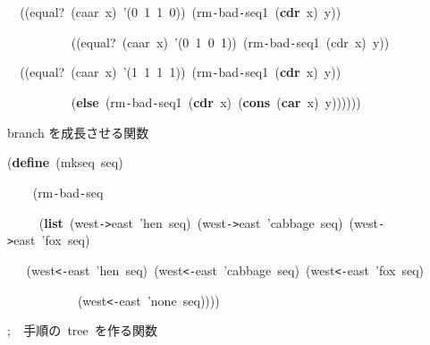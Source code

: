 \documentclass[a4paper,10pt]{article}
\def\mc{\relax}
\begin{document}
\noindent
\mbox{}{\tt\mc \ }{\tt\mc \ }((equal?{\tt\mc \ }(caar{\tt\mc \ }x){\tt\mc \ }'(0{\tt\mc \ }1{\tt\mc \ }1{\tt\mc \ }0)){\tt\mc \ }(rm{\tt -}bad{\tt -}seq1{\tt\mc \ }(\textbf{cdr}{\tt\mc \ }x){\tt\mc \ }y))

\noindent
\mbox{}{\tt\mc \ }{\tt\mc \ }{\tt\mc \ }{\tt\mc \ }{\tt\mc \ }{\tt\mc \ }{\tt\mc \ }{\tt\mc \ }{\tt\mc \ }{\tt\mc \ }((equal?{\tt\mc \ }(caar{\tt\mc \ }x){\tt\mc \ }'(0{\tt\mc \ }1{\tt\mc \ }0{\tt\mc \ }1)){\tt\mc \ }(rm{\tt -}bad{\tt -}seq1{\tt\mc \ }(cdr{\tt\mc \ }x){\tt\mc \ }y))

\noindent
\mbox{}{\tt\mc \ }{\tt\mc \ }((equal?{\tt\mc \ }(caar{\tt\mc \ }x){\tt\mc \ }'(1{\tt\mc \ }1{\tt\mc \ }1{\tt\mc \ }1)){\tt\mc \ }(rm{\tt -}bad{\tt -}seq1{\tt\mc \ }(\textbf{cdr}{\tt\mc \ }x){\tt\mc \ }y))

\noindent
\mbox{}{\tt\mc \ }{\tt\mc \ }{\tt\mc \ }{\tt\mc \ }{\tt\mc \ }{\tt\mc \ }{\tt\mc \ }{\tt\mc \ }{\tt\mc \ }{\tt\mc \ }(\textbf{else}{\tt\mc \ }(rm{\tt -}bad{\tt -}seq1{\tt\mc \ }(\textbf{cdr}{\tt\mc \ }x){\tt\mc \ }(\textbf{cons}{\tt\mc \ }(\textbf{car}{\tt\mc \ }x){\tt\mc \ }y))))))

\noindent
\mbox{}\hfill

\noindent
\mbox{}\rm\mc {\tt ;}  branch を成長させる関数
\tt\mc 

\noindent
\mbox{}(\textbf{define}{\tt\mc \ }(mkseq{\tt\mc \ }seq)

\noindent
\mbox{}{\tt\mc \ }{\tt\mc \ }{\tt\mc \ }{\tt\mc \ }(rm{\tt -}bad{\tt -}seq

\noindent
\mbox{}{\tt\mc \ }{\tt\mc \ }{\tt\mc \ }{\tt\mc \ }{\tt\mc \ }(\textbf{list}{\tt\mc \ }(west{\tt -}{\tt >}east{\tt\mc \ }'hen{\tt\mc \ }seq){\tt\mc \ }(west{\tt -}{\tt >}east{\tt\mc \ }'cabbage{\tt\mc \ }seq){\tt\mc \ }(west{\tt -}{\tt >}east{\tt\mc \ }'fox{\tt\mc \ }seq)

\noindent
\mbox{}{\tt\mc \ }{\tt\mc \ }{\tt\mc \ }(west{\tt <}{\tt -}east{\tt\mc \ }'hen{\tt\mc \ }seq){\tt\mc \ }(west{\tt <}{\tt -}east{\tt\mc \ }'cabbage{\tt\mc \ }seq){\tt\mc \ }(west{\tt <}{\tt -}east{\tt\mc \ }'fox{\tt\mc \ }seq)

\noindent
\mbox{}{\tt\mc \ }{\tt\mc \ }{\tt\mc \ }{\tt\mc \ }{\tt\mc \ }{\tt\mc \ }{\tt\mc \ }{\tt\mc \ }{\tt\mc \ }{\tt\mc \ }{\tt\mc \ }(west{\tt <}{\tt -}east{\tt\mc \ }'none{\tt\mc \ }seq))))

\noindent
\mbox{}\hfill

\noindent
\mbox{};{\tt\mc \ }{\tt\mc \ }手順の{\tt\mc \ }tree{\tt\mc \ }を作る関数
\end{document}
